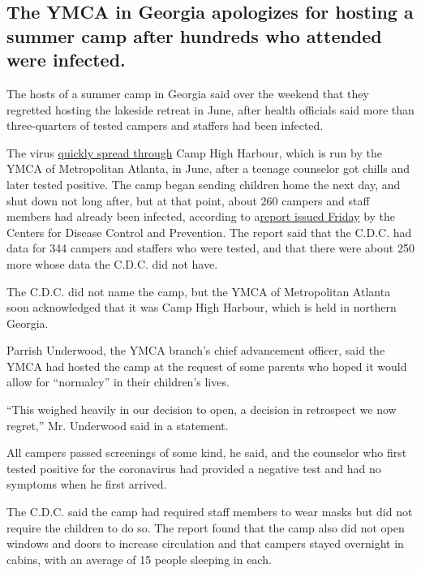 \hypertarget{the-ymca-in-georgia-apologizes-for-hosting-a-summer-camp-after-hundreds-who-attended-were-infected}{%
\subsection{The YMCA in Georgia apologizes for hosting a summer camp
after hundreds who attended were
infected.}\label{the-ymca-in-georgia-apologizes-for-hosting-a-summer-camp-after-hundreds-who-attended-were-infected}}

The hosts of a summer camp in Georgia said over the weekend that they
regretted hosting the lakeside retreat in June, after health officials
said more than three-quarters of tested campers and staffers had been
infected.

The virus
\href{https://www.nytimes3xbfgragh.onion/2020/07/31/health/coronavirus-children-camp.html}{quickly
spread through} Camp High Harbour, which is run by the YMCA of
Metropolitan Atlanta, in June, after a teenage counselor got chills and
later tested positive. The camp began sending children home the next
day, and shut down not long after, but at that point, about 260 campers
and staff members had already been infected, according to
a\href{https://www.cdc.gov/mmwr/volumes/69/wr/mm6931e1.htm?s_cid=mm6931e1_w}{report
issued Friday} by the Centers for Disease Control and Prevention. The
report said that the C.D.C. had data for 344 campers and staffers who
were tested, and that there were about 250 more whose data the C.D.C.
did not have.

The C.D.C. did not name the camp, but the YMCA of Metropolitan Atlanta
soon acknowledged that it was Camp High Harbour, which is held in
northern Georgia.

Parrish Underwood, the YMCA branch's chief advancement officer, said the
YMCA had hosted the camp at the request of some parents who hoped it
would allow for ``normalcy'' in their children's lives.

``This weighed heavily in our decision to open, a decision in retrospect
we now regret,'' Mr. Underwood said in a statement.

All campers passed screenings of some kind, he said, and the counselor
who first tested positive for the coronavirus had provided a negative
test and had no symptoms when he first arrived.

The C.D.C. said the camp had required staff members to wear masks but
did not require the children to do so. The report found that the camp
also did not open windows and doors to increase circulation and that
campers stayed overnight in cabins, with an average of 15 people
sleeping in each.

